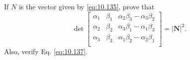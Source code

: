 \begin{myexercise}
    \label{ex:10.30}
    If $N$ is the vector given by \eqref{eq:10.135},
    prove that
    \begin{equation*}
        \det
        \begin{bmatrix}
            \alpha_1 & \beta_1 & \alpha_2 \beta_3 - \alpha_3 \beta_2 \\
            \alpha_2 & \beta_2 & \alpha_3 \beta_1 - \alpha_1 \beta_3 \\
            \alpha_3 & \beta_3 & \alpha_1 \beta_2 - \alpha_2 \beta_1 \\
        \end{bmatrix} =
        \left| \mathbf{N} \right|^2 .
    \end{equation*}
    Also, verify Eq. \eqref{eq:10.137}.
\end{myexercise}


